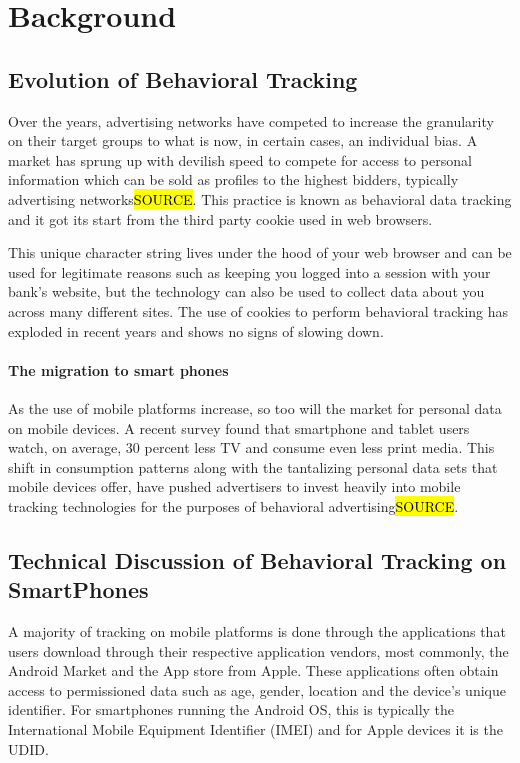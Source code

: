 \section{Background}

	\subsection{Evolution of Behavioral Tracking}

Over the years, advertising networks have competed to increase the granularity on their target groups to what is now, in certain cases, an individual bias. A market has sprung up with devilish speed to compete for access to personal information which can be sold as profiles to the highest bidders, typically advertising networks\hl{SOURCE}. This practice is known as behavioral data tracking and it got its start from the third party cookie used in web browsers.

This unique character string lives under the hood of your web browser and can be used for legitimate reasons such as keeping you logged into a session with your bank’s website, but the technology can also be used to collect data about you across many different sites. The use of cookies to perform behavioral tracking has exploded in recent years and shows no signs of slowing down\cite{Cens2012}.

		\paragraph{The migration to smart phones}
As the use of mobile platforms increase, so too will the market for personal data on mobile devices. A recent survey found that smartphone and tablet users watch, on average, 30 percent less TV and consume even less print media\cite{Abi2012}. This shift in consumption patterns along with the tantalizing personal data sets that mobile devices offer, have pushed advertisers to invest heavily into mobile tracking technologies for the purposes of behavioral advertising\hl{SOURCE}.
   

	\subsection{Technical Discussion of Behavioral Tracking on SmartPhones}

A majority of tracking on mobile platforms is done through the applications that users download through their respective application vendors, most commonly, the Android Market and the App store from Apple. These applications often obtain access to permissioned data such as age, gender, location and the device’s unique identifier. For smartphones running the Android OS, this is typically the International Mobile Equipment Identifier (IMEI) and for Apple devices it is the UDID.

